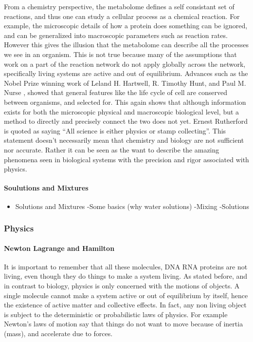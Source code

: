 \documentclass[a4paper,11pt,oneside]{book}
\begin{document}
From a chemistry perspective, the metabolome defines a self consistant set of reactions, and thus one can study a cellular process as a chemical reaction. For example, the microscopic details of how a protein does something can be ignored, and can be generalized into macroscopic parameters such as reaction rates. However this gives the illusion that the metabolome can describe all the processes we see in an organism. This is not true because many of the assumptions that work on a part of the reaction network do not apply globally across the network, specifically living systems are active and out of equilibrium. Advances such as the Nobel Prize winning work of Leland H. Hartwell, R. Timothy Hunt, and Paul M. Nurse , showed that general features like the life cycle of cell are conserved between organisms, and selected for. This again shows that although information exists for both the microscopic physical and macroscopic biological level, but a method to directly and precisely connect the two does not yet. Ernest Rutherford is quoted as saying ``All science is either physics or stamp collecting''. This statement doesn't necessarily mean that chemistry and biology are not sufficient nor accurate. Rather it can be seen as the want to describe the amazing phenomena seen in biological systems with the precision and rigor associated with physics.

\paragraph{Soulutions and Mixtures}

\begin{itemize}
\item Solutions and Mixtures \newline
-Some basics (why water solutions)\newline
-Mixing\newline
-Solutions
\end{itemize}

\subsubsection{Physics}

\paragraph{Newton Lagrange and Hamilton}

It is important to remember that all these molecules, DNA RNA proteins are not living, even though they do things to make a system living. As stated before, and in contrast to biology, physics is only concerned with the motions of objects. A single molecule cannot make a system active or out of equilibrium by itself, hence the existence of active matter and collective effects. In fact, any non living object is subject to the deterministic or probabilistic laws of physics. For example Newton's laws of motion say that things do not want to move because of inertia (mass), and accelerate due to forces.
\end{document}
